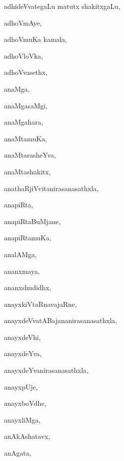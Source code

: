 \begin{multicols}{3}
{\noindent
{adhideVvategaLu matutx shakitxgaLu}, \pageref{adhideVvategaLu matutx shakitxgaLu}

\noindent
{adhoVmAye}, \pageref{adhoVmAye}

\noindent
{adhoVmuKa kamala}, \pageref{adhoVmuKa kamala}

\noindent
{adhoVloVka}, \pageref{adhoVloVka}

\noindent
{adhoVvasethx}, \pageref{adhoVvasethx}

\noindent
{anaMga}, \pageref{anaMga}

\noindent
{anaMgasaMgi}, \pageref{anaMgasaMgi}

\noindent
{anaMgahara}, \pageref{anaMgahara}

\noindent
{anaMtamuKa}, \pageref{anaMtamuKa}

\noindent
{anaMtarasheYva}, \pageref{anaMtarasheYva}

\noindent
{anaMtashakitx}, \pageref{anaMtashakitx}

\noindent
{anathaRjiVvitanirasanasathxla}, \pageref{anathaRjiVvitanirasanasathxla}

\noindent
{anapiRta}, \pageref{anapiRta}

\noindent
{anapiRtaBuMjane}, \pageref{anapiRtaBuMjane}

\noindent
{anapiRtamuKa}, \pageref{anapiRtamuKa}

\noindent
{analAMga}, \pageref{analAMga}

\noindent
{ananxmaya}, \pageref{ananxmaya}

\noindent
{ananxshudidhx}, \pageref{ananxshudidhx}

\noindent
{anayxkiVtaRnavajaRne}, \pageref{anayxkiVtaRnavajaRne}

\noindent
{anayxdeVvatABajananirasanasathxla}, \pageref{anayxdeVvatABajananirasanasathxla}

\noindent
{anayxdeVhi}, \pageref{anayxdeVhi}

\noindent
{anayxdeYva}, \pageref{anayxdeYva}

\noindent
{anayxdeYvanirasanasathxla}, \pageref{anayxdeYvanirasanasathxla}

\noindent
{anayxpUje}, \pageref{anayxpUje}

\noindent
{anayxboVdhe}, \pageref{anayxboVdhe}

\noindent
{anayxliMga}, \pageref{anayxliMga}

\noindent
{anAkAshatavx}, \pageref{anAkAshatavx}

\noindent
{anAgata}, \pageref{anAgata}

}
\end{multicols}
